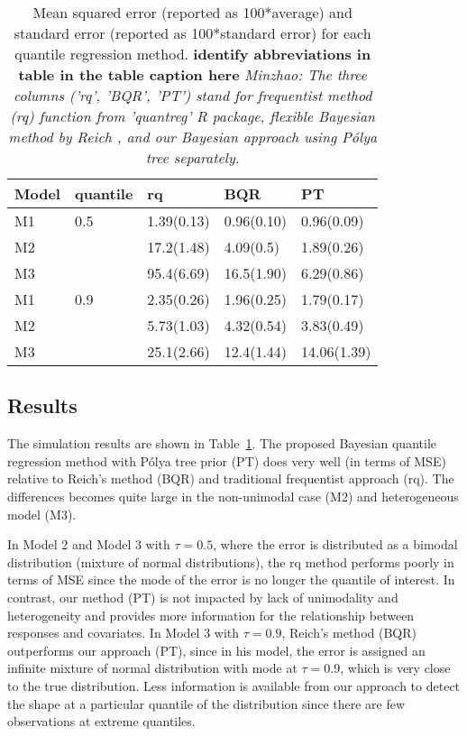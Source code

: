 \documentclass[12pt]{article}
\newcommand{\polya}{P\'{o}lya}
\begin{document}
\begin{center}
  \begin{table}[h]
    \centering
    \caption[]{ Mean squared error (reported as 100*average) and standard
      error (reported as 100*standard error) for each
      quantile regression method.  {\bf identify abbreviations in
        table in the table caption here} {\it Minzhao: The three
        columns ('rq', 'BQR',
        'PT') stand for frequentist method (rq) function from
        'quantreg' R package, flexible Bayesian method by Reich , and
        our Bayesian approach using \polya{} tree separately.}}
    \vspace{4mm}
    \begin{tabular}[tb]{l|l|lll}
      \hline
      Model & quantile & rq         & BQR        & PT          \\
      \hline
      M1    & 0.5      & 1.39(0.13) & 0.96(0.10) & 0.96(0.09)  \\
      M2    &          & 17.2(1.48) & 4.09(0.5)  & 1.89(0.26)  \\
      M3    &          & 95.4(6.69) & 16.5(1.90) & 6.29(0.86)  \\
      \hline
      M1    & 0.9      & 2.35(0.26) & 1.96(0.25) & 1.79(0.17)  \\
      M2    &          & 5.73(1.03) & 4.32(0.54) & 3.83(0.49)  \\
      M3    &          & 25.1(2.66) & 12.4(1.44) & 14.06(1.39) \\
      \hline
    \end{tabular}
    \label{tab:1}
  \end{table}
\end{center}

\subsection{Results}
The simulation results are shown in Table~\ref{tab:1}. The proposed
Bayesian quantile regression method with \polya{} tree prior (PT)
does very well (in terms of MSE) relative to Reich's method (BQR)
and traditional frequentist approach
(rq).
The differences becomes quite large in
the  non-unimodal case (M2) and heterogeneous model (M3).

In Model 2 and Model 3 with $\tau=0.5$, where the error is
distributed as a bimodal distribution (mixture of normal
distributions), the rq method performs poorly in terms of MSE
since the mode of the error is no longer the quantile of
interest. In contrast, our method (PT) is not impacted by lack of
unimodality and heterogeneity and provides more information
for the relationship between responses and covariates. In Model 3
with $\tau=0.9$, Reich's method (BQR) outperforms our approach (PT),
since in his model, the error is assigned an infinite mixture of
normal distribution with mode at $\tau=0.9$, which is very close to
the true distribution. Less information is available from our
approach to detect the shape at a particular quantile of the
distribution since there are few observations at extreme quantiles.
\end{document}
